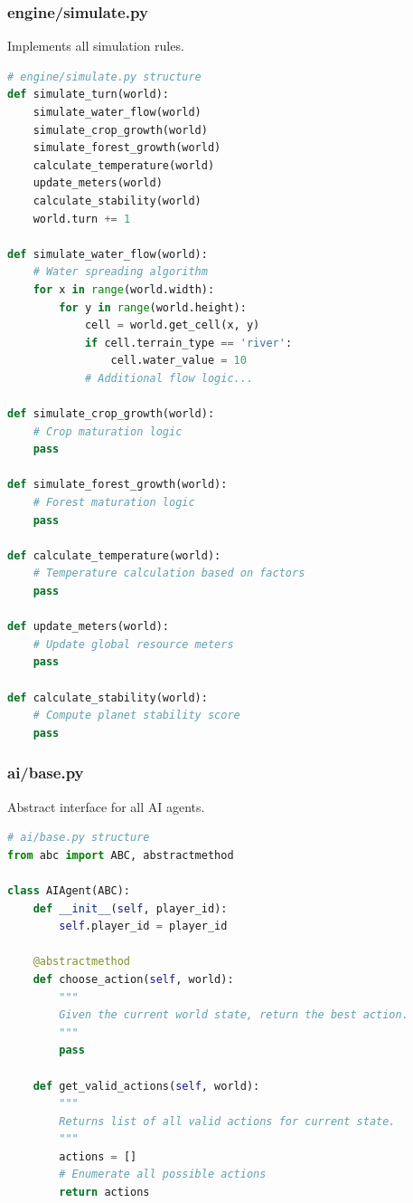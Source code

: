 \documentclass[12pt,a4paper]{article}
\begin{document}
\subsubsection{engine/simulate.py}

Implements all simulation rules.

\begin{lstlisting}[language=Python]
# engine/simulate.py structure
def simulate_turn(world):
    simulate_water_flow(world)
    simulate_crop_growth(world)
    simulate_forest_growth(world)
    calculate_temperature(world)
    update_meters(world)
    calculate_stability(world)
    world.turn += 1

def simulate_water_flow(world):
    # Water spreading algorithm
    for x in range(world.width):
        for y in range(world.height):
            cell = world.get_cell(x, y)
            if cell.terrain_type == 'river':
                cell.water_value = 10
            # Additional flow logic...

def simulate_crop_growth(world):
    # Crop maturation logic
    pass

def simulate_forest_growth(world):
    # Forest maturation logic
    pass

def calculate_temperature(world):
    # Temperature calculation based on factors
    pass

def update_meters(world):
    # Update global resource meters
    pass

def calculate_stability(world):
    # Compute planet stability score
    pass
\end{lstlisting}

\subsubsection{ai/base.py}

Abstract interface for all AI agents.

\begin{lstlisting}[language=Python]
# ai/base.py structure
from abc import ABC, abstractmethod

class AIAgent(ABC):
    def __init__(self, player_id):
        self.player_id = player_id
    
    @abstractmethod
    def choose_action(self, world):
        """
        Given the current world state, return the best action.
        """
        pass
    
    def get_valid_actions(self, world):
        """
        Returns list of all valid actions for current state.
        """
        actions = []
        # Enumerate all possible actions
        return actions
\end{lstlisting}
\end{document}
